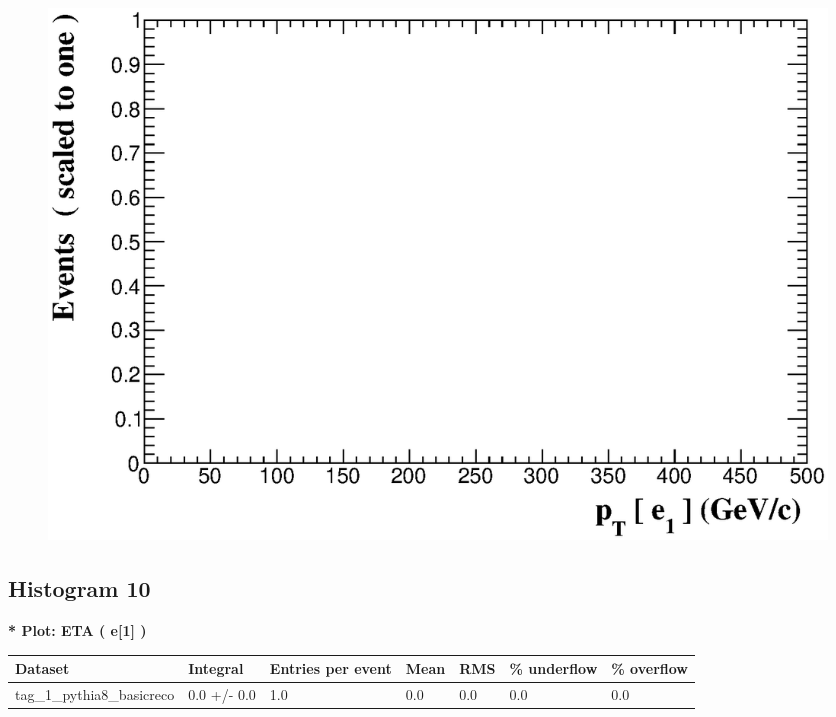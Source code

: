 \documentclass[a4paper, 10pt]{article}
\begin{document}
\begin{figure}[H]
  \begin{center}
    \includegraphics[scale=0.45]{selection_8.eps}\\
\caption{   }
  \end{center}
\end{figure}
      \newpage
\subsection{ Histogram 10}

\textbf{* Plot: ETA ( e[1] ) }\\
   \begin{table}[H]
  \begin{center}
    \begin{tabular}{|m{23.0mm}|m{23.0mm}|m{18.0mm}|m{19.0mm}|m{19.0mm}|m{19.0mm}|m{19.0mm}|}
      \hline
      {\cellcolor{yellow}         Dataset}& {\cellcolor{yellow}         Integral}& {\cellcolor{yellow}         Entries per event}& {\cellcolor{yellow}         Mean}& {\cellcolor{yellow}         RMS}& {\cellcolor{yellow}         \% underflow}& {\cellcolor{yellow}         \% overflow}\\
      \hline
      {\cellcolor{white}         tag\_1\_pythia8\_basicreco}& {\cellcolor{white}         0.0 +/\-- 0.0}& {\cellcolor{white}         1.0}& {\cellcolor{white}         0.0}& {\cellcolor{white}         0.0}& {\cellcolor{green}         0.0}& {\cellcolor{green}         0.0}\\
\hline
    \end{tabular}
  \end{center}
\end{table}
\end{document}
